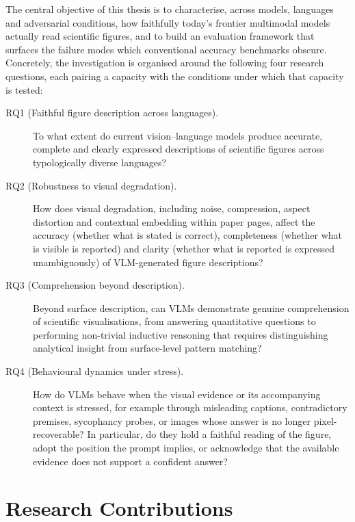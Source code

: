 The central objective of this thesis is to characterise, across
models, languages and adversarial conditions, how faithfully
today's frontier multimodal models actually read scientific
figures, and to build an evaluation framework that surfaces the
failure modes which conventional accuracy benchmarks obscure.
Concretely, the investigation is organised around the following
four research questions, each pairing a capacity with the
conditions under which that capacity is tested:

\begin{description}
\item[RQ1 (Faithful figure description across languages).] To what
  extent do current vision--language models produce accurate,
  complete and clearly expressed descriptions of scientific figures
  across typologically diverse languages?

\item[RQ2 (Robustness to visual degradation).] How does visual
  degradation, including noise, compression, aspect distortion and
  contextual embedding within paper pages, affect the accuracy
  (whether what is stated is correct), completeness (whether what
  is visible is reported) and clarity (whether what is reported is
  expressed unambiguously) of VLM-generated figure descriptions?

\item[RQ3 (Comprehension beyond description).] Beyond surface
  description, can VLMs demonstrate genuine comprehension of
  scientific visualisations, from answering quantitative
  questions to performing non-trivial inductive reasoning that
  requires distinguishing analytical insight from surface-level
  pattern matching?

\item[RQ4 (Behavioural dynamics under stress).] How do VLMs
  behave when the visual evidence or its accompanying context
  is stressed, for example through misleading captions,
  contradictory premises, sycophancy probes, or images whose
  answer is no longer pixel-recoverable? In particular, do
  they hold a faithful reading of the figure, adopt the
  position the prompt implies, or acknowledge that the
  available evidence does not support a confident answer?
\end{description}

\section{Research Contributions}
\label{sec:intro-contributions}

